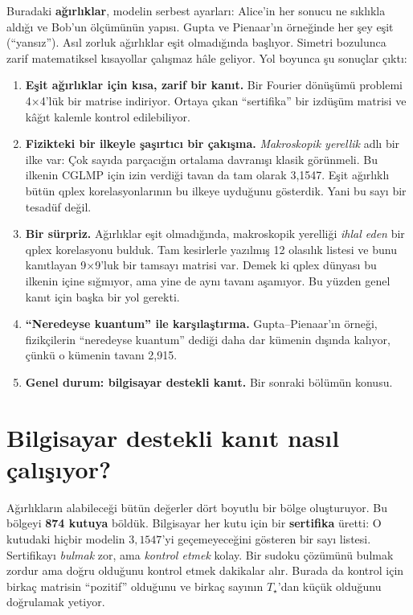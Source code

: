 \documentclass[11pt]{article}
\begin{document}
Buradaki \textbf{ağırlıklar}, modelin serbest ayarları: Alice'in her sonucu ne sıklıkla aldığı ve Bob'un
ölçümünün yapısı. Gupta ve Pienaar'ın örneğinde her şey eşit (“yansız”). Asıl zorluk ağırlıklar eşit
olmadığında başlıyor. Simetri bozulunca zarif matematiksel kısayollar çalışmaz hâle geliyor. Yol boyunca
şu sonuçlar çıktı:

\begin{enumerate}[leftmargin=*]
  \item \textbf{Eşit ağırlıklar için kısa, zarif bir kanıt.} Bir Fourier dönüşümü problemi 4×4'lük bir
        matrise indiriyor. Ortaya çıkan “sertifika” bir izdüşüm matrisi ve kâğıt kalemle kontrol edilebiliyor.
  \item \textbf{Fizikteki bir ilkeyle şaşırtıcı bir çakışma.} \emph{Makroskopik yerellik} adlı bir ilke var:
        Çok sayıda parçacığın ortalama davranışı klasik görünmeli. Bu ilkenin CGLMP için izin verdiği tavan da
        tam olarak 3,1547. Eşit ağırlıklı bütün qplex korelasyonlarının bu ilkeye uyduğunu gösterdik. Yani bu
        sayı bir tesadüf değil.
  \item \textbf{Bir sürpriz.} Ağırlıklar eşit olmadığında, makroskopik yerelliği \emph{ihlal eden} bir qplex
        korelasyonu bulduk. Tam kesirlerle yazılmış 12 olasılık listesi ve bunu kanıtlayan 9×9'luk bir tamsayı
        matrisi var. Demek ki qplex dünyası bu ilkenin içine sığmıyor, ama yine de aynı tavanı aşamıyor. Bu
        yüzden genel kanıt için başka bir yol gerekti.
  \item \textbf{“Neredeyse kuantum” ile karşılaştırma.} Gupta–Pienaar'ın örneği, fizikçilerin “neredeyse
        kuantum” dediği daha dar kümenin dışında kalıyor, çünkü o kümenin tavanı 2,915.
  \item \textbf{Genel durum: bilgisayar destekli kanıt.} Bir sonraki bölümün konusu.
\end{enumerate}

\section{Bilgisayar destekli kanıt nasıl çalışıyor?}

Ağırlıkların alabileceği bütün değerler dört boyutlu bir bölge oluşturuyor. Bu bölgeyi \textbf{874
kutuya} böldük. Bilgisayar her kutu için bir \textbf{sertifika} üretti: O kutudaki hiçbir modelin
$3{,}1547$'yi geçemeyeceğini gösteren bir sayı listesi. Sertifikayı \emph{bulmak} zor, ama \emph{kontrol
etmek} kolay. Bir sudoku çözümünü bulmak zordur ama doğru olduğunu kontrol etmek dakikalar alır. Burada da
kontrol için birkaç matrisin “pozitif” olduğunu ve birkaç sayının $T_\star$'dan küçük olduğunu doğrulamak
yetiyor.
\end{document}
